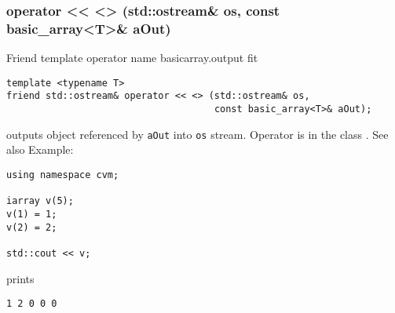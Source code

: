\subsubsection{operator <{}< <> (std::ostream\& os, const basic\_array<T>\& aOut)}
Friend template operator%
\pdfdest name {basicarray.output} fit
\begin{verbatim}
template <typename T>
friend std::ostream& operator << <> (std::ostream& os,
                                     const basic_array<T>& aOut);
\end{verbatim}
outputs  object referenced by \verb"aOut" into
\verb"os" stream.
Operator is  in the class
.
See also  
Example:
\begin{Verbatim}
using namespace cvm;

iarray v(5);
v(1) = 1;
v(2) = 2;

std::cout << v;
\end{Verbatim}
prints
\begin{Verbatim}
1 2 0 0 0
\end{Verbatim}
\newpage

